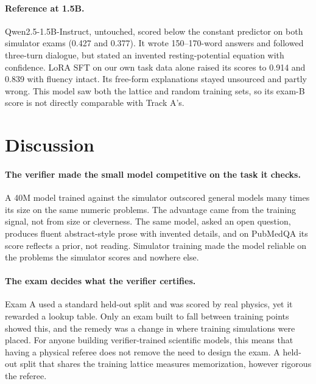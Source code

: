 \documentclass[11pt]{article}
\begin{document}
\paragraph{Reference at 1.5B.} Qwen2.5-1.5B-Instruct, untouched, scored
below the constant predictor on both simulator exams (0.427 and 0.377).
It wrote 150--170-word answers and followed three-turn dialogue, but stated
an invented resting-potential equation with confidence. LoRA SFT on our own
task data alone raised its scores to 0.914 and 0.839 with fluency
intact. Its free-form explanations stayed unsourced and partly wrong. This
model saw both the lattice and random training sets, so its exam-B score is
not directly comparable with Track A's.

\section{Discussion}
\label{sec:discussion}

\paragraph{The verifier made the small model competitive on the task it
checks.} A 40M model trained against the simulator outscored
general models many times its size on the same numeric problems. The advantage came from the training signal, not from size or
cleverness. The same model, asked an open question, produces fluent
abstract-style prose with invented details, and on PubMedQA its score
reflects a prior, not reading. Simulator training made the model reliable
on the problems the simulator scores and nowhere else.

\paragraph{The exam decides what the verifier certifies.} Exam A used a
standard held-out split and was scored by real physics, yet it rewarded a
lookup table. Only an exam built to fall between training points showed
this, and the remedy was a change in where training simulations were
placed. For anyone building verifier-trained scientific models, this means
that having a physical referee does not remove the need to design the
exam. A held-out split that shares the training lattice measures
memorization, however rigorous the referee.
\end{document}
